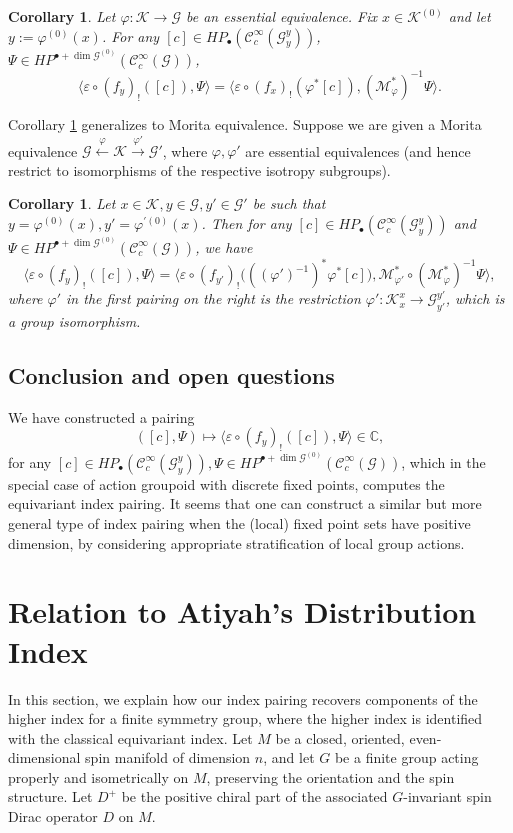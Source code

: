 \documentclass[a4paper]{amsart}
\newcommand{\CC}{\mathbb C}
\newcommand{\maC}{\mathcal C}
\newcommand{\maG}{\mathcal G}
\newcommand{\maK}{\mathcal K}
\newcommand{\maM}{\mathcal M}
\newcommand\<{\langle}
\renewcommand\>{\rangle}
\newtheorem{cor}[theorem]{Corollary}
\theoremstyle{definition}
\theoremstyle{remark}
\begin{document}
\begin{cor}
\label{CD7}
Let $\varphi : \maK \to \maG$ be an essential equivalence. Fix $x \in \maK ^{(0)}$ and let $y := \varphi ^{(0)} (x)$.
For any $[c] \in H P _\bullet (\maC^\infty _c (\maG ^y _y))$, $\Psi \in H P ^{\bullet + \dim \maG ^{(0)}} (\maC^\infty _c (\maG))$,
$$ \langle \varepsilon \circ (f _y)_! ([c]) ,  \Psi \rangle
= \langle \varepsilon \circ (f _x)_! (\varphi ^* [c]) , (\maM _\varphi ^* )^{-1} \Psi \rangle .$$
\end{cor}

Corollary \ref{CD7} generalizes to Morita equivalence.
Suppose we are given a Morita equivalence $\maG \xleftarrow{\varphi} \maK \xrightarrow{\varphi '} \maG'$,
where $\varphi , \varphi'$ are essential equivalences (and hence restrict to isomorphisms of the respective isotropy subgroups).
\begin{cor}
Let $x \in \maK , y \in \maG , y' \in \maG'$ be such that $y = \varphi ^{(0)} (x), y' = \varphi ^{\prime (0)} (x)$.
Then for any $[c] \in H P _\bullet (\maC^\infty _c (\maG ^y _y))$
and $\Psi \in H P ^{\bullet + \dim \maG ^{(0)}} (\maC^\infty _c (\maG))$,
we have
$$ \big\langle \varepsilon \circ (f _y)_! ([c]) ,  \Psi \big\rangle
= \big\langle \varepsilon \circ (f _{y'})_! \big(((\varphi')^{-1})^* \varphi ^* [c] \big) ,
\maM ^* _{\varphi '} \circ (\maM ^* _\varphi )^{-1} \Psi \big\rangle ,$$
where $\varphi '$ in the first pairing on the right is the restriction $\varphi' : \maK ^x _x \to \maG ^{y'} _{y'}$,
which is a group isomorphism.
\end{cor}

\subsection{Conclusion and open questions}
We have constructed a pairing
$$ ([c], \Psi) \mapsto \langle \varepsilon \circ (f _y)_! ([c]) ,  \Psi \rangle \in \CC,$$
for any $[c] \in H P _\bullet (\maC ^\infty _c (\maG ^y_y)), \Psi \in H P ^{\bullet + \dim \maG ^{(0)}} (\maC ^\infty _c (\maG))$,
which in the special case of action groupoid with discrete fixed points,
computes the equivariant index pairing.
It seems that one can construct a similar but more general type of index pairing when the
(local) fixed point sets have positive dimension,
by considering appropriate stratification of local group actions.

\section{Relation to Atiyah's Distribution Index}
In this section, we explain how our index pairing recovers components of the higher index
for a finite symmetry group, where the higher index is identified with the classical equivariant index.
Let $M$ be a closed, oriented, even-dimensional spin manifold of dimension $n$,
and let $G$ be a finite group acting properly and isometrically on $M$, preserving the orientation and the spin structure.
Let $D ^+$ be the positive chiral part of the associated $G$-invariant spin Dirac operator $D$ on $M$.
\end{document}
